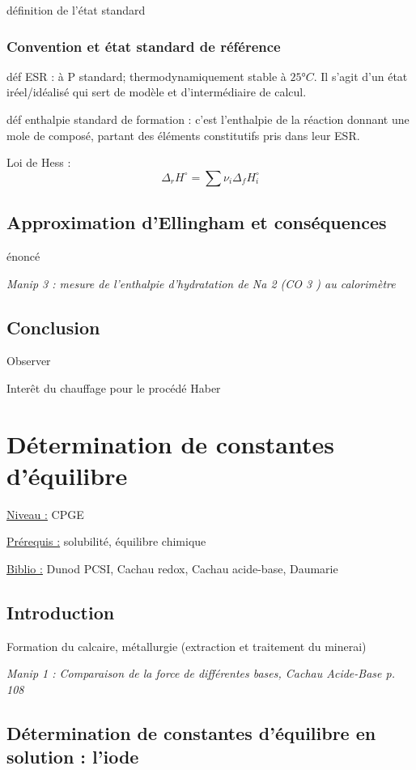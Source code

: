 \documentclass{article}%
\begin{document}
définition de l'état standard
\subsubsection{Convention et état standard de référence}
déf ESR : à P standard; thermodynamiquement stable à $25°C$. Il s'agit d'un état iréel/idéalisé qui sert de modèle et d'intermédiaire de calcul.

déf enthalpie standard de formation : c'est l'enthalpie de la réaction donnant une mole de composé, partant des éléments constitutifs pris dans leur ESR.

Loi de Hess : \[\Delta_r H^\circ =\sum \nu_i \Delta_f H^\circ_i\]


\subsection{Approximation d'Ellingham et conséquences}
énoncé

\textit{Manip 3 : mesure de l’enthalpie d’hydratation de Na 2 (CO 3 ) au calorimètre}

\subsection{Conclusion}

Observer

Interêt du chauffage pour le procédé Haber

\section{Détermination de constantes d'équilibre}
\underline{Niveau :} CPGE 

\underline{Prérequis :} solubilité, équilibre chimique

\underline{Biblio :} Dunod PCSI, Cachau redox, Cachau acide-base, Daumarie

\subsection{Introduction}

Formation du calcaire, métallurgie (extraction et traitement du minerai)

\textit{Manip 1 : Comparaison de la force de différentes bases, Cachau Acide-Base p. 108}

\subsection{Détermination de constantes d'équilibre en solution : l'iode}
\end{document}

